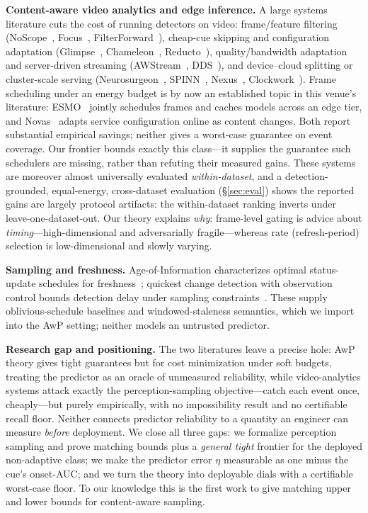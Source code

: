 ﻿\documentclass[lettersize,journal]{IEEEtran}
\begin{document}
\textbf{Content-aware video analytics and edge inference.} A large systems literature cuts the cost of running detectors on video: frame/feature filtering (NoScope~\cite{noscope}, Focus~\cite{focus}, FilterForward~\cite{filterforward}), cheap-cue skipping and configuration adaptation (Glimpse~\cite{glimpse}, Chameleon~\cite{chameleon}, Reducto~\cite{reducto}), quality/bandwidth adaptation and server-driven streaming (AWStream~\cite{awstream}, DDS~\cite{dds}), and device--cloud splitting or cluster-scale serving (Neurosurgeon~\cite{neurosurgeon}, SPINN~\cite{spinn}, Nexus~\cite{nexus}, Clockwork~\cite{clockwork}). Frame scheduling under an energy budget is by now an established topic in this venue's literature: ESMO~\cite{esmo} jointly schedules frames and caches models across an edge tier, and Novas~\cite{novas} adapts service configuration online as content changes. Both report substantial empirical savings; neither gives a worst-case guarantee on event coverage. Our frontier bounds exactly this class---it supplies the guarantee such schedulers are missing, rather than refuting their measured gains. These systems are moreover almost universally evaluated \emph{within-dataset}, and a detection-grounded, equal-energy, cross-dataset evaluation (\S\ref{sec:eval}) shows the reported gains are largely protocol artifacts: the within-dataset ranking inverts under leave-one-dataset-out. Our theory explains \emph{why}: frame-level gating is advice about \emph{timing}---high-dimensional and adversarially fragile---whereas rate (refresh-period) selection is low-dimensional and slowly varying.

\textbf{Sampling and freshness.} Age-of-Information characterizes optimal status-update schedules for freshness~\cite{aoi}; quickest change detection with observation control bounds detection delay under sampling constraints~\cite{qcd}. These supply oblivious-schedule baselines and windowed-staleness semantics, which we import into the AwP setting; neither models an untrusted predictor.

\textbf{Research gap and positioning.} The two literatures leave a precise hole: AwP theory gives tight guarantees but for cost minimization under soft budgets, treating the predictor as an oracle of unmeasured reliability, while video-analytics systems attack exactly the perception-sampling objective---catch each event once, cheaply---but purely empirically, with no impossibility result and no certifiable recall floor. Neither connects predictor reliability to a quantity an engineer can measure \emph{before} deployment. We close all three gaps: we formalize perception sampling and prove matching bounds plus a \emph{general tight} frontier for the deployed non-adaptive class; we make the predictor error $\eta$ measurable as one minus the cue's onset-AUC; and we turn the theory into deployable dials with a certifiable worst-case floor. To our knowledge this is the first work to give matching upper and lower bounds for content-aware sampling.
\end{document}
